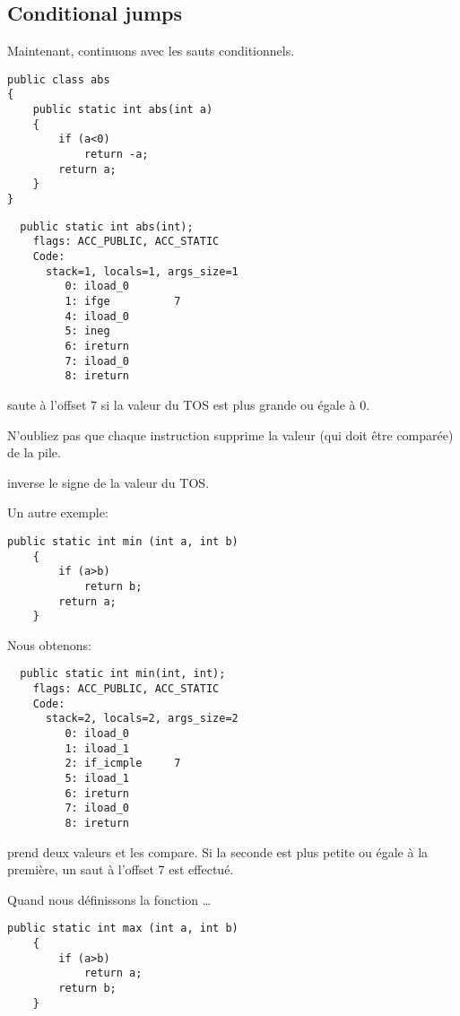\subsection{Conditional jumps}

Maintenant, continuons avec les sauts conditionnels.

\begin{lstlisting}[style=customjava]
public class abs
{
	public static int abs(int a)
	{
		if (a<0)
			return -a;
		return a;
	}
}
\end{lstlisting}

\begin{lstlisting}
  public static int abs(int);
    flags: ACC_PUBLIC, ACC_STATIC
    Code:
      stack=1, locals=1, args_size=1
         0: iload_0
         1: ifge          7
         4: iload_0
         5: ineg
         6: ireturn
         7: iload_0
         8: ireturn
\end{lstlisting}

 saute à l'offset 7 si la valeur du \ac{TOS} est plus grande ou égale à 0.

N'oubliez pas que chaque instruction  supprime la valeur (qui doit être
comparée) de la pile.


 inverse le signe de la valeur du \ac{TOS}.


Un autre exemple:

\begin{lstlisting}[style=customjava]
	public static int min (int a, int b)
	{
		if (a>b)
			return b;
		return a;
	}
\end{lstlisting}

Nous obtenons:

\begin{lstlisting}
  public static int min(int, int);
    flags: ACC_PUBLIC, ACC_STATIC
    Code:
      stack=2, locals=2, args_size=2
         0: iload_0
         1: iload_1
         2: if_icmple     7
         5: iload_1
         6: ireturn
         7: iload_0
         8: ireturn
\end{lstlisting}

 prend deux valeurs et les compare.
Si la seconde est plus petite ou égale à la première, un saut à l'offset 7 est effectué.


Quand nous définissons la fonction  \dots


\begin{lstlisting}[style=customjava]
	public static int max (int a, int b)
	{
		if (a>b)
			return a;
		return b;
	}
\end{lstlisting}

